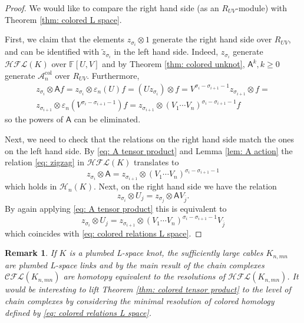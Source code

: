 \documentclass{amsart}
\newtheorem{remark}[theorem]{Remark}
\newcommand{\CA}{\mathcal{A}}
\newcommand{\CH}{\mathcal{H}}
\newcommand{\col}{\mathrm{col}}
\newcommand{\F}{\mathbb{F}}
\newcommand{\cCFL}{\mathcal{C\!F\!L}}
\newcommand{\cHFL}{\mathcal{H\!F\! L}}
\newcommand{\EG}[1]{{\color{red}#1}}
\newcommand{\AAA}{\mathsf{A}}
\begin{document}
\begin{proof}
We would like to compare the right hand side (as an $R_{UV}$-module) with Theorem \ref{thm: colored L space}. 

First, we claim that the elements $z_{\sigma_i}\otimes 1$ generate the right hand side over $R_{UV}$, and can be identified with $\widetilde{z}_{\sigma_i}$ in the left hand side. Indeed, $z_{\sigma_i}$ generate $\cHFL(K)$ over $\F[U,V]$ and by Theorem \ref{thm: colored unknot},  $\AAA^k,k\ge 0$ generate $\CA_n^{\col}$ over $R_{UV}$. Furthermore,
\begin{multline}
\label{eq: A tensor product}
z_{\sigma_i}\otimes \AAA f=z_{\sigma_i}\otimes \varepsilon_n(U)f=(Uz_{\sigma_i})\otimes f=V^{\sigma_i-\sigma_{i+1}-1}z_{\sigma_{i+1}}\otimes f=
\\
z_{\sigma_{i+1}}\otimes \varepsilon_n(V^{\sigma_i-\sigma_{i+1}-1})f=z_{\sigma_{i+1}}\otimes (V_1\cdots V_n)^{\sigma_i-\sigma_{i+1}-1}f
\end{multline}
so the powers of $\AAA$ can be eliminated. 

Next, we need to check that the relations on the right hand side match the ones on the left hand side. By \eqref{eq: A tensor product} and Lemma \ref{lem: A action} the relation \eqref{eq: zigzag} in $\cHFL(K)$ translates to 
$$
z_{\sigma_i}\otimes \AAA=z_{\sigma_{i+1}}\otimes (V_1\cdots V_n)^{\sigma_i-\sigma_{i+1}-1}
$$
which holds in $\CH_{n}(K)$. Next, on the right hand side we have the relation 
$$
z_{\sigma_i}\otimes U_j=z_{\sigma_j}\otimes \AAA V_{\overline{j}}. 
$$
By again applying \eqref{eq: A tensor product} this is equivalent to
$$
z_{\sigma_i}\otimes U_j=z_{\sigma_{i+1}}\otimes (V_1\cdots V_n)^{\sigma_i-\sigma_{i+1}-1}V_{\overline{j}}
$$
which coincides with \eqref{eq: colored relations L space}.
\end{proof}


\begin{remark}
If $K$ is a plumbed L-space knot, the sufficiently large cables $K_{n,mn}$ are plumbed L-space links and by the main result of \cite{BLZ} the chain complexes $\cCFL(K_{n,mn})$ are homotopy equivalent to the resolutions of $\cHFL(K_{n,mn})$. It would be interesting to lift Theorem \ref{thm: colored tensor product} to the level of chain complexes by considering the minimal resolution of colored homology defined by \eqref{eq: colored relations L space}.
\end{remark}
\end{document}
